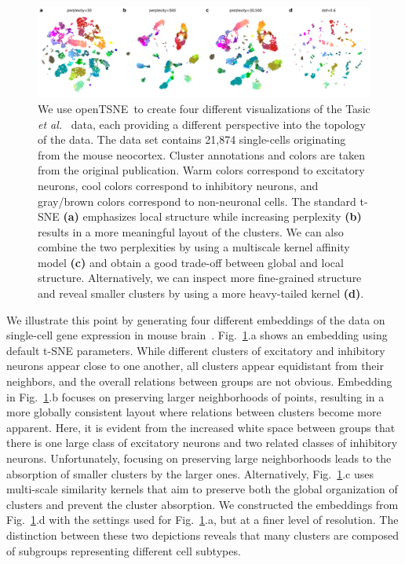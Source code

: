 \documentclass[twocolumn]{bmcart}
\newcommand{\opentsne}{\textsf{openTSNE}}
\begin{document}
\begin{figure}[htbp]
	\includegraphics[width=\textwidth]{tasic2018}
	\caption{\label{fig:tasic}We use \opentsne\ to create four different
    visualizations of the Tasic \textit{et al.}~\cite{tasic2018shared} data,
    each providing a different perspective into the topology of the data.
    The data set contains 21,874 single-cells originating from the mouse
	neocortex. Cluster annotations and colors are taken from the original
	publication. Warm colors correspond to excitatory neurons, cool colors
	correspond to inhibitory neurons, and gray/brown colors correspond to
	non-neuronal cells. The standard t-SNE \textbf{(a)} emphasizes local
	structure while increasing perplexity \textbf{(b)} results in a more
	meaningful layout of the clusters. We can also combine the two
	perplexities by using a multiscale kernel affinity model \textbf{(c)}
	and obtain a good trade-off between global and local structure.
	Alternatively, we can inspect more fine-grained structure and reveal
	smaller clusters by using a more heavy-tailed kernel \textbf{(d)}.}
\end{figure}

We illustrate this point by generating four different embeddings of the data on
single-cell gene expression in mouse brain~\cite{tasic2018shared}.
Fig.~\ref{fig:tasic}.a shows an embedding using default t-SNE parameters. While
different clusters of excitatory and inhibitory neurons appear close to one
another, all clusters appear equidistant from their neighbors, and the overall
relations between groups are not obvious. Embedding in Fig.~\ref{fig:tasic}.b
focuses on preserving larger neighborhoods of points, resulting in a more
globally consistent layout where relations between clusters become more
apparent. Here, it is evident from the increased white space between groups that
there is one large class of excitatory neurons and two related classes of
inhibitory neurons. Unfortunately, focusing on preserving large neighborhoods
leads to the absorption of smaller clusters by the larger ones. Alternatively,
Fig.~\ref{fig:tasic}.c uses multi-scale similarity kernels that aim to preserve
both the global organization of clusters and prevent the cluster absorption. We
constructed the embeddings from Fig.~\ref{fig:tasic}.d with the settings used
for Fig.~\ref{fig:tasic}.a, but at a finer level of resolution. The distinction
between these two depictions reveals that many clusters are composed of
subgroups representing different cell subtypes.
\end{document}

